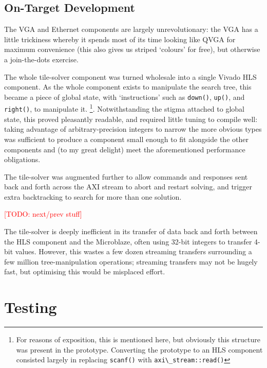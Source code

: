 \documentclass[a4paper,12pt]{article}
\newcommand{\todo}[1]{\textcolor{red}{[TODO: #1]}}
\begin{document}
\subsection{On-Target Development}

The VGA and Ethernet components are largely unrevolutionary: the VGA
has a little trickiness whereby it spends most of its time looking
like QVGA for maximum convenience (this also gives us striped
`colours' for free), but otherwise a join-the-dots exercise.

The whole tile-solver component was turned wholesale into a single
Vivado HLS component. As the whole component exists to manipulate the
search tree, this became a piece of global state, with `instructions'
such as \texttt{down()}, \texttt{up()}, and \texttt{right()}, to
manipulate it.
\footnote{For reasons of exposition, this is mentioned here, but
  obviously this structure was present in the prototype. Converting
  the prototype to an HLS component consisted largely in replacing
  \texttt{scanf()} with \verb!axi\_stream::read()!}.
Notwithstanding the stigma attached to global state, this proved
pleasantly readable, and required little tuning to compile well:
taking advantage of arbitrary-precision integers to narrow the more
obvious types was sufficient to produce a component small enough to
fit alongside the other components and (to my great delight) meet the
aforementioned performance obligations.

The tile-solver was augmented further to allow commands and responses
sent back and forth across the AXI stream to abort and restart
solving, and trigger extra backtracking to search for more than one
solution.

\todo{next/prev stuff}

The tile-solver is deeply inefficient in its transfer of data back and
forth between the HLS component and the Microblaze, often using 32-bit
integers to transfer 4-bit values. However, this wastes a few dozen
streaming transfers surrounding a few million tree-manipulation
operations; streaming transfers may not be hugely fast, but optimising
this would be misplaced effort.

\section{Testing}
\end{document}
